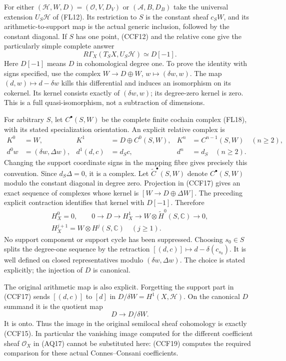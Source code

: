\documentclass[11pt,a4paper]{article}
\theoremstyle{definition}\newtheorem{definition}[theorem]{Definition}
\begin{document}
For either $(\mathcal H,W,D)=(\mathcal O,V,D_V)$ or
$(\mathcal A,B,D_B)$ take the universal extension $U_S\mathcal H$
of (FL12). Its restriction to $S$ is the constant sheaf $c_SW$,
and its arithmetic-to-support map is the actual generic
inclusion, followed by the constant diagonal. If $S$ has one
point, (CCF12) and the relative cone give the particularly
simple complete answer
\[
 R\Gamma_X(T_SX,U_S\mathcal H)\simeq D[-1].
 \tag{CCF16}
\]
Here $D[-1]$ means $D$ in cohomological degree one. To prove the
identity with signs specified, use the complex
$W\to D\oplus W$, $w\mapsto(\delta w,w)$.
The map $(d,w)\mapsto d-\delta w$ kills this differential and
induces an isomorphism on its cokernel. Its kernel consists
exactly of $(\delta w,w)$; its degree-zero kernel is zero.
This is a full quasi-isomorphism, not a subtraction of dimensions.

For arbitrary $S$, let $C^\bullet(S,W)$ be the complete finite
cochain complex (FL18), with its stated specialization orientation.
An explicit relative complex is
\[
 \begin{aligned}
 K^0&=W,& K^1&=D\oplus C^0(S,W),&
 K^{n}&=C^{n-1}(S,W)\quad(n\ge2),\\
 d^0w&=(\delta w,\Delta w),& d^1(d,c)&=d_Sc,&
 d^{n}&=d_S\quad(n\ge2).
 \end{aligned}
 \tag{CCF17}
\]
Changing the support coordinate signs in the mapping fibre
gives precisely this convention. Since $d_S\Delta=0$, it is
a complex. Let $\widetilde C^\bullet(S,W)$ denote
$C^\bullet(S,W)$ modulo the constant diagonal in degree zero.
Projection in (CCF17) gives an exact sequence of complexes
whose kernel is $[W\to D\oplus\Delta W]$. The preceding explicit
contraction identifies that kernel with $D[-1]$. Therefore
\[
 \begin{gathered}
 H_X^0=0,\qquad
 0\longrightarrow D\longrightarrow H_X^1
   \longrightarrow W\otimes\widetilde H^0(S,\mathbb C)
   \longrightarrow0,\\
 H_X^{j+1}=W\otimes H^j(S,\mathbb C)\quad(j\ge1).
 \end{gathered}
 \tag{CCF18}
\]
No support component or support cycle has been suppressed.
Choosing $s_0\in S$ splits the degree-one sequence by the
retraction $[(d,c)]\mapsto d-\delta(c_{s_0})$. It is well defined
on closed representatives modulo $(\delta w,\Delta w)$.
The choice is stated explicitly; the injection of $D$ is canonical.

The original arithmetic map is also explicit. Forgetting the
support part in (CCF17) sends $[(d,c)]$ to $[d]$ in
$D/\delta W=H^1(X,\mathcal H)$. On the canonical $D$ summand it
is the quotient map
\[
 D\longrightarrow D/\delta W.
 \tag{CCF19}
\]
It is onto. Thus the image in the original semilocal sheaf
cohomology is exactly (CCF15). In particular the vanishing image
computed for the different coefficient sheaf $\mathcal O_X$ in
(AQ17) cannot be substituted here: (CCF19) computes the required
comparison for these actual Connes--Consani coefficients.
\end{document}
